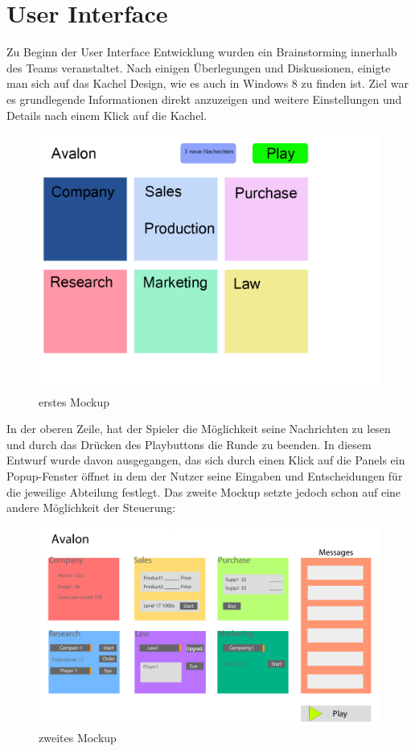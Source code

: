 \section{User Interface}
Zu Beginn der User Interface Entwicklung wurden ein Brainstorming innerhalb des Teams veranstaltet. Nach einigen Überlegungen und Diskussionen, einigte man sich auf das Kachel Design, wie es auch in Windows 8 zu finden ist. Ziel war es grundlegende Informationen direkt anzuzeigen und weitere Einstellungen und Details nach einem Klick auf die Kachel.

\begin{figure}[H]
\centering
\includegraphics[width=0.7\linewidth]{../images/mockup1}
\caption{erstes Mockup}
\label{fig:mockup1}
\end{figure}


In der oberen Zeile, hat der Spieler die Möglichkeit seine Nachrichten zu lesen und durch das Drücken des Playbuttons die Runde zu beenden. In diesem Entwurf wurde davon ausgegangen, das sich durch einen Klick auf die Panels ein Popup-Fenster öffnet in dem der Nutzer seine Eingaben und Entscheidungen für die jeweilige Abteilung festlegt.  Das zweite Mockup setzte jedoch schon auf eine andere Möglichkeit der Steuerung:

\begin{figure}[H]
\centering
\includegraphics[width=0.7\linewidth]{../images/mockup2}
\caption{zweites Mockup}
\label{fig:mockup2}
\end{figure}

